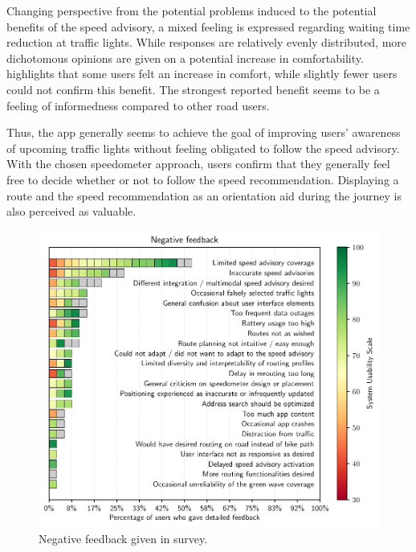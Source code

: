 Changing perspective from the potential problems induced to the potential benefits of the speed advisory, a mixed feeling is expressed regarding waiting time reduction at traffic lights. While responses are relatively evenly distributed, more dichotomous opinions are given on a potential increase in comfortability.  highlights that some users felt an increase in comfort, while slightly fewer users could not confirm this benefit. The strongest reported benefit seems to be a feeling of informedness compared to other road users. 

Thus, the app generally seems to achieve the goal of improving users' awareness of upcoming traffic lights without feeling obligated to follow the speed advisory. With the chosen speedometer approach, users confirm that they generally feel free to decide whether or not to follow the speed recommendation. Displaying a route and the speed recommendation as an orientation aid during the journey is also perceived as valuable.

\begin{figure}[t]
\caption{Negative feedback given in survey.}\label{fig:app-negative-feedback}
\includegraphics[width=\linewidth]{images/app-feedback-negative.pdf}
\end{figure}

